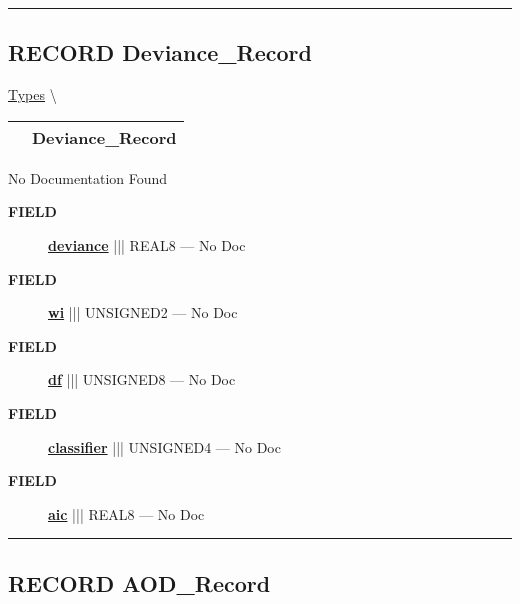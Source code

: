 \rule{\linewidth}{0.5pt}
\subsection*{\textsf{\colorbox{headtoc}{\color{white} RECORD}
Deviance\_Record}}

\hypertarget{ecldoc:logisticregression.types.deviance_record}{}
\hspace{0pt} \hyperlink{ecldoc:LogisticRegression.Types}{Types} \textbackslash 

{\renewcommand{\arraystretch}{1.5}
\begin{tabularx}{\textwidth}{|>{\raggedright\arraybackslash}l|X|}
\hline
\hspace{0pt}\mytexttt{\color{red} } & \textbf{Deviance\_Record} \\
\hline
\end{tabularx}
}

\par





No Documentation Found







\par
\begin{description}
\item [\colorbox{tagtype}{\color{white} \textbf{\textsf{FIELD}}}] \textbf{\underline{deviance}} ||| REAL8 --- No Doc
\item [\colorbox{tagtype}{\color{white} \textbf{\textsf{FIELD}}}] \textbf{\underline{wi}} ||| UNSIGNED2 --- No Doc
\item [\colorbox{tagtype}{\color{white} \textbf{\textsf{FIELD}}}] \textbf{\underline{df}} ||| UNSIGNED8 --- No Doc
\item [\colorbox{tagtype}{\color{white} \textbf{\textsf{FIELD}}}] \textbf{\underline{classifier}} ||| UNSIGNED4 --- No Doc
\item [\colorbox{tagtype}{\color{white} \textbf{\textsf{FIELD}}}] \textbf{\underline{aic}} ||| REAL8 --- No Doc
\end{description}





\rule{\linewidth}{0.5pt}
\subsection*{\textsf{\colorbox{headtoc}{\color{white} RECORD}
AOD\_Record}}

